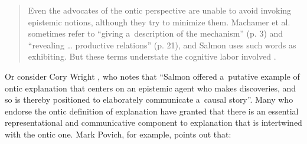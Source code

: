 \begin{quotation}
Even the advocates of the ontic perspective are unable to avoid invoking epistemic notions, although they try to minimize them. Machamer et al. sometimes refer to ``giving a~description of the mechanism'' (p. 3) and ``revealing … productive relations'' (p. 21), and Salmon uses such words as exhibiting. But these terms understate the cognitive labor involved
\parencite[][p.18]{bechtel_mental_2008}.%


\end{quotation}
Or consider Cory Wright
\parencite*[][p.27]{wright_ontic_2015}, %
 who notes that ``Salmon offered a~putative example of ontic explanation that centers on an epistemic agent who makes discoveries, and so is thereby positioned to elaborately communicate a~causal story''. Many who endorse the ontic definition of explanation have granted that there is an essential representational and communicative component to explanation that is intertwined with the ontic one. Mark Povich, for example, points out that:

